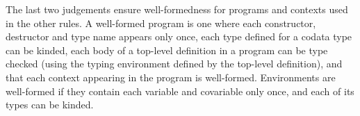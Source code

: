 The last two judgements ensure well-formedness for programs and contexts used in the other rules.
A well-formed program is one where each constructor, destructor and type name appears only once, each type defined for a codata type can be kinded, each body of a top-level definition in a program can be type checked (using the typing environment defined by the top-level definition), and that each context appearing in the program is well-formed.
Environments are well-formed if they contain each variable and covariable only once, and each of its types can be kinded.
